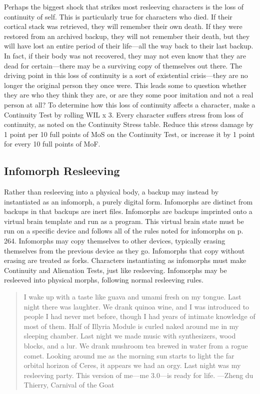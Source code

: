 Perhaps the biggest shock that strikes most resleeving 
characters is the loss of continuity of self. This is particularly true for characters who died. If their cortical 
stack was retrieved, they will remember their own 
death. If they were restored from an archived backup, 
they will not remember their death, but they will have 
lost an entire period of their life—all the way back to 
their last backup. In fact, if their body was not recovered, they may not even know that they are dead for 
certain—there may be a surviving copy of themselves 
out there. The driving point in this loss of continuity is 
a sort of existential crisis—they are no longer the original person they once were. This leads some to question 
whether they are who they think they are, or are they 
some poor imitation and not a real person at all?
To determine how this loss of continuity affects a 
character, make a Continuity Test by rolling WIL x 3. 
Every character suffers stress from loss of continuity, 
as noted on the Continuity Stress table. Reduce this 
stress damage by 1 point per 10 full points of MoS on 
the Continuity Test, or increase it by 1 point for every 
10 full points of MoF.

\subsection{Infomorph Resleeving}

Rather than resleeving into a physical body, a backup 
may instead by instantiated as an infomorph, a purely 
digital form. Infomorphs are distinct from backups in 
that backups are inert files. Infomorphs are backups 
imprinted onto a virtual brain template and run as 
a program. This virtual brain state must be run on a 
specific device and follows all of the rules noted for 
infomorphs on p. 264. Infomorphs may copy themselves to other devices, typically erasing themselves 
from the previous device as they go. Infomorphs that 
copy without erasing are treated as forks.
Characters instantiating as infomorphs must make 
Continuity and Alienation Tests, just like resleeving.
Infomorphs may be resleeved into physical morphs, 
following normal resleeving rules.

\begin{quotation}
I wake up with a taste like guava and umami
fresh on my tongue. Last night there was laughter.
We drank quinoa wine, and I was introduced
to people I had never met before, though I had
years of intimate knowledge of most of them.
Half of Illyria Module is curled naked around
me in my sleeping chamber. Last night we
made music with synthesizers, wood blocks,
and a lur. We drank mushroom tea brewed in
water from a rogue comet. Looking around me
as the morning sun starts to light the far orbital
horizon of Ceres, it appears we had an orgy.
Last night was my resleeving party. This version
of me—me 3.0—is ready for life.
—Zheng du Thierry, Carnival of the Goat
\end{quotation}


